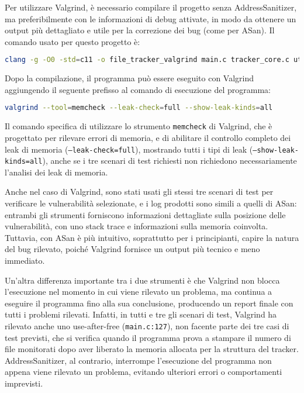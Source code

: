 Per utilizzare Valgrind, è necessario compilare il progetto senza
AddressSanitizer, ma preferibilmente con le informazioni di debug attivate, in
modo da ottenere un output più dettagliato e utile per la correzione dei bug (come
per ASan). Il comando usato per questo progetto è:
\begin{lstlisting}[language=bash, numbers=none]
clang -g -O0 -std=c11 -o file_tracker_valgrind main.c tracker_core.c utils.c
\end{lstlisting}

Dopo la compilazione, il programma può essere eseguito con Valgrind aggiungendo
il seguente prefisso al comando di esecuzione del programma: \begin{lstlisting}[language=bash, numbers=none]
valgrind --tool=memcheck --leak-check=full --show-leak-kinds=all
\end{lstlisting}

Il comando specifica di utilizzare lo strumento \texttt{memcheck} di Valgrind,
che è progettato per rilevare errori di memoria, e di abilitare il controllo completo
dei leak di memoria (\texttt{--leak-check=full}), mostrando tutti i tipi di leak
(\texttt{--show-leak-kinds=all}), anche se i tre scenari di test richiesti non richiedono
necessariamente l'analisi dei leak di memoria.

Anche nel caso di Valgrind, sono stati usati gli stessi tre scenari di test per
verificare le vulnerabilità selezionate, e i log prodotti sono simili a quelli di
ASan: entrambi gli strumenti forniscono informazioni dettagliate sulla posizione
delle vulnerabilità, con uno stack trace e informazioni sulla memoria coinvolta.
Tuttavia, con ASan è più intuitivo, soprattutto per i principianti, capire la natura
del bug rilevato, poiché Valgrind fornisce un output più tecnico e meno
immediato.

Un'altra differenza importante tra i due strumenti è che Valgrind non blocca l'esecuzione
nel momento in cui viene rilevato un problema, ma continua a eseguire il programma
fino alla sua conclusione, producendo un report finale con tutti i problemi
rilevati. Infatti, in tutti e tre gli scenari di test, Valgrind ha rilevato anche
uno use-after-free (\texttt{main.c:127}), non facente parte dei tre casi di test
previsti, che si verifica quando il programma prova a stampare il numero di file
monitorati dopo aver liberato la memoria allocata per la struttura del tracker. AddressSanitizer,
al contrario, interrompe l'esecuzione del programma non appena viene rilevato un
problema, evitando ulteriori errori o comportamenti imprevisti.

